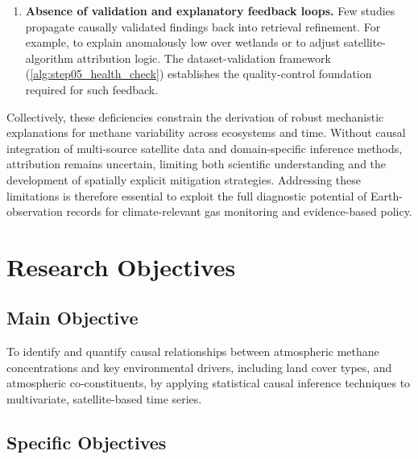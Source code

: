 \begin{enumerate}
    
    \item \textbf{Absence of validation and explanatory feedback loops.}  
    Few studies propagate causally validated findings back into retrieval refinement. For example, to explain anomalously low  over wetlands or to adjust satellite-algorithm attribution logic.  
    The dataset-validation framework (\autoref{alg:step05_health_check}) establishes the quality-control foundation required for such feedback.

\end{enumerate}

Collectively, these deficiencies constrain the derivation of robust mechanistic explanations for methane variability across ecosystems and time.  Without causal integration of multi-source satellite data and domain-specific inference methods, attribution remains uncertain, limiting both scientific understanding and the development of spatially explicit mitigation strategies.  Addressing these limitations is therefore essential to exploit the full diagnostic potential of Earth-observation records for climate-relevant gas monitoring and evidence-based policy.




\section{Research Objectives}
\label{sec:research-objectives}

\subsection{Main Objective}

To identify and quantify causal relationships between atmospheric methane concentrations and key environmental drivers, including land cover types, and atmospheric co-constituents, by applying statistical causal inference techniques to multivariate, satellite-based time series.

\subsection{Specific Objectives}

